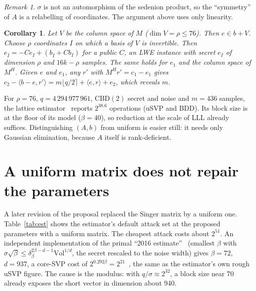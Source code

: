 \documentclass[11pt]{article}
\newtheorem{corollary}{Corollary}
\theoremstyle{remark}
\newtheorem{remark}{Remark}
\begin{document}
\begin{remark}
$\sigma$ is not an automorphism of the sedenion product, so the ``symmetry'' of $A$ is a relabelling of coordinates. The
argument above uses only linearity.
\end{remark}

\begin{corollary}
Let $V$ be the column space of $M$ ($\dim V=\rho\le76$). Then $e\in b+V$. Choose $\rho$ coordinates $I$ on which a basis
of $V$ is invertible. Then $e_{\bar I}=-C e_I+(b_{\bar I}+C b_I)$ for a public $C$, an LWE instance with secret $e_I$ of
dimension $\rho$ and $16k-\rho$ samples. The same holds for $e_1$ and the column space of $M^{H}$. Given $e$ and $e_1$, any
$r'$ with $M^{H}r'=c_1-e_1$ gives $c_2-\langle b-e,r'\rangle=m\lfloor q/2\rceil+\langle e,r\rangle+e_2$, which reveals $m$.
\end{corollary}

For $\rho=76$, $q=4\,294\,977\,961$, CBD$(2)$ secret and noise and $m=436$ samples, the lattice
estimator~\cite{APS15,estimator} reports $2^{38.6}$ operations (uSVP and BDD). Its block size is at the floor of its
model ($\beta=40$), so reduction at the scale of LLL already suffices. Distinguishing $(A,b)$ from uniform is easier
still: it needs only Gaussian elimination, because $A$ itself is rank-deficient.

\section{A uniform matrix does not repair the parameters}\label{sec:uniform}

A later revision of the proposal replaced the Singer matrix by a uniform one. Table~\ref{tab:est} shows the estimator's
default attack set at the proposed parameters with a uniform matrix. The cheapest attack costs about $2^{51}$. An
independent implementation of the primal ``2016 estimate''~\cite{ADPS16} (smallest $\beta$ with
$\sigma\sqrt\beta\le\delta_\beta^{2\beta-d-1}\mathrm{Vol}^{1/d}$, the secret rescaled to the noise width) gives $\beta=72$,
$d=937$, a core-SVP cost of $2^{0.292\beta}=2^{21}$~\cite{BDGL16}, the same as the estimator's own rough uSVP figure.
The cause is the modulus: with $q/\sigma\approx2^{32}$, a block size near 70 already exposes the short vector in
dimension about 940.
\end{document}
